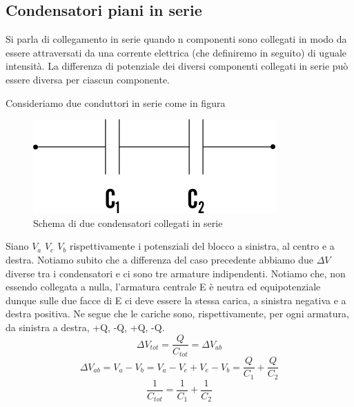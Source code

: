 \documentclass[
10pt, %
a4paper, %
oneside, %
headinclude,footinclude, %
BCOR5mm, %
]{scrartcl}
\begin{document}
\subsection*{Condensatori piani in serie}
\begin{definizione}
	Si parla di collegamento in serie quando n componenti sono collegati in modo da essere attraversati da una corrente elettrica (che definiremo in seguito) di uguale intensità. La differenza di potenziale dei diversi componenti collegati in serie può essere diversa per ciascun componente.
\end{definizione}
Consideriamo due conduttori in serie come in figura
\begin{figure}[h!]
	\centering
	\includegraphics[width=0.6\linewidth]{images/Condensatori_serie}
	\caption{Schema di due condensatori collegati in serie}
	\label{fig:condensatoriserie}
\end{figure}
\FloatBarrier
Siano \(V_a\) \(V_e\) \(V_b\) rispettivamente i potensziali del blocco a sinistra, al centro e a destra. Notiamo subito che a differenza del caso precedente abbiamo due \(\Delta V\) diverse tra i condensatori e ci sono tre armature indipendenti. Notiamo che, non essendo collegata a nulla, l'armatura centrale E è neutra ed equipotenziale dunque sulle due facce di E ci deve essere la stessa carica, a sinistra negativa e a destra positiva. Ne segue che le cariche sono, rispettivamente, per ogni armatura, da sinistra a destra, +Q, -Q, +Q, -Q. 
\[\Delta V_{tot} = \frac{Q}{C_{tot}} = \Delta V_{ab}\]
\[\Delta V_{ab} = V_a-V_b=V_a-V_e+V_e-V_b = \frac{Q}{C_1}+\frac{Q}{C_2}\]
\[\frac{1}{C_{tot}} = \frac{1}{C_1} + \frac{1}{C_2}\]
\end{document}
